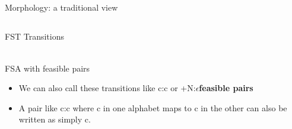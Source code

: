 \documentclass[9pt,xcolor=pdftex,dvipsnames,table]{beamer}
\begin{document}
\subsection{}
\begin{frame}{Morphology: a traditional view}

\begin{center}
\end{center}
\end{frame}

\subsection{}
\begin{frame}{FST Transitions}
\begin{center}
	\\
	{\large FSA with feasible pairs}\\
\end{center}
\vspace{.5cm}
\begin{itemize}
     \item We can also call these transitions like c:c or +N:$\epsilon $\textbf{feasible pairs}
     \item A pair like c:c where c in one alphabet maps to c in the other can also be written as simply c.

\end{itemize}
\end{frame}
\end{document}
